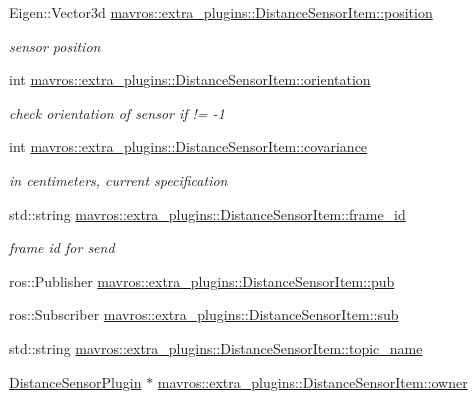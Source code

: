 \begin{DoxyCompactItemize}
Eigen\+::\+Vector3d \mbox{\hyperlink{group__plugin_ga0d2d16da9abd307183e28dca358cc82d}{mavros\+::extra\+\_\+plugins\+::\+Distance\+Sensor\+Item\+::position}}
\begin{DoxyCompactList}\small\item\em sensor position \end{DoxyCompactList}\item 
int \mbox{\hyperlink{group__plugin_ga43f807eab20df3eafb28caf582e4b77b}{mavros\+::extra\+\_\+plugins\+::\+Distance\+Sensor\+Item\+::orientation}}
\begin{DoxyCompactList}\small\item\em check orientation of sensor if != -\/1 \end{DoxyCompactList}\item 
int \mbox{\hyperlink{group__plugin_ga9795eedbcdd190f5131ceee05829bea1}{mavros\+::extra\+\_\+plugins\+::\+Distance\+Sensor\+Item\+::covariance}}
\begin{DoxyCompactList}\small\item\em in centimeters, current specification \end{DoxyCompactList}\item 
std\+::string \mbox{\hyperlink{group__plugin_ga6b41efde5ba3e2b5822233811dd45997}{mavros\+::extra\+\_\+plugins\+::\+Distance\+Sensor\+Item\+::frame\+\_\+id}}
\begin{DoxyCompactList}\small\item\em frame id for send \end{DoxyCompactList}\item 
ros\+::\+Publisher \mbox{\hyperlink{group__plugin_ga0604c0a60bf1edd2f50b3d0fe4171eec}{mavros\+::extra\+\_\+plugins\+::\+Distance\+Sensor\+Item\+::pub}}
\item 
ros\+::\+Subscriber \mbox{\hyperlink{group__plugin_ga59362a543db0805a4669950637451270}{mavros\+::extra\+\_\+plugins\+::\+Distance\+Sensor\+Item\+::sub}}
\item 
std\+::string \mbox{\hyperlink{group__plugin_gaec60262d11a7bb202f471aa4d6608615}{mavros\+::extra\+\_\+plugins\+::\+Distance\+Sensor\+Item\+::topic\+\_\+name}}
\item 
\mbox{\hyperlink{classmavros_1_1extra__plugins_1_1DistanceSensorPlugin}{Distance\+Sensor\+Plugin}} $\ast$ \mbox{\hyperlink{group__plugin_ga4f45665ceec645c00b6692388d8c0d51}{mavros\+::extra\+\_\+plugins\+::\+Distance\+Sensor\+Item\+::owner}}
\end{DoxyCompactItemize}
